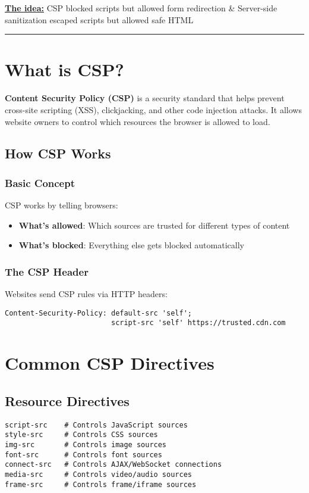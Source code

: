 \documentclass{article}
\begin{document}
\begin{itemize}
\textbf{\underline{The idea:}} CSP blocked scripts but allowed form redirection \& Server-side sanitization escaped scripts but allowed safe HTML\\
\rule{15cm}{0.4pt}


\section*{What is CSP?}

\textbf{Content Security Policy (CSP)} is a security standard that helps prevent cross-site scripting (XSS), clickjacking, and other code injection attacks. It allows website owners to control which resources the browser is allowed to load.

\subsection{How CSP Works}

\subsubsection{Basic Concept}
CSP works by telling browsers:
\begin{itemize}
    \item \textbf{What's allowed}: Which sources are trusted for different types of content
    \item \textbf{What's blocked}: Everything else gets blocked automatically
\end{itemize}

\subsubsection{The CSP Header}
Websites send CSP rules via HTTP headers:
\begin{lstlisting}[frame=single]
Content-Security-Policy: default-src 'self';
                         script-src 'self' https://trusted.cdn.com
\end{lstlisting}

\section{Common CSP Directives}

\subsection{Resource Directives}
\begin{lstlisting}[backgroundcolor=\color{gray!10}]
script-src    # Controls JavaScript sources
style-src     # Controls CSS sources
img-src       # Controls image sources
font-src      # Controls font sources
connect-src   # Controls AJAX/WebSocket connections
media-src     # Controls video/audio sources
frame-src     # Controls frame/iframe sources
\end{lstlisting}


\end{itemize}
\end{document}
